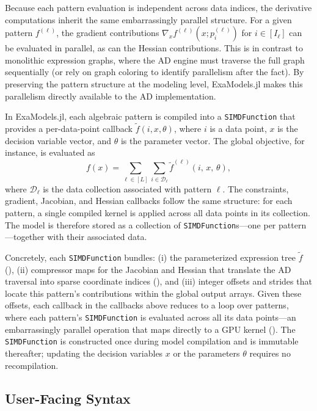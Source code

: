\documentclass[11pt]{article}
\begin{document}
Because each pattern evaluation is independent across data indices, the derivative computations inherit the same embarrassingly parallel structure. For a given pattern $f^{(\ell)}$, the gradient contributions $\nabla_x f^{(\ell)}(x; p_i^{(\ell)})$ for $i \in [I_\ell]$ can be evaluated in parallel, as can the Hessian contributions. This is in contrast to monolithic expression graphs, where the AD engine must traverse the full graph sequentially (or rely on graph coloring to identify parallelism after the fact). By preserving the pattern structure at the modeling level, ExaModels.jl makes this parallelism directly available to the AD implementation.

In ExaModels.jl, each algebraic pattern is compiled into a \texttt{SIMDFunction} that provides a per-data-point callback $\tilde{f}(i, x, \theta)$, where $i$ is a data point, $x$ is the decision variable vector, and $\theta$ is the parameter vector. The global objective, for instance, is evaluated as
\begin{equation}\label{eq:simdfunction}
  f(x) = \sum_{\ell \in [L]} \sum_{i \in \mathcal{D}_\ell} \tilde{f}^{(\ell)}(i,\, x,\, \theta),
\end{equation}
where $\mathcal{D}_\ell$ is the data collection associated with pattern $\ell$. The constraints, gradient, Jacobian, and Hessian callbacks follow the same structure: for each pattern, a single compiled kernel is applied across all data points in its collection. The model is therefore stored as a collection of \texttt{SIMDFunction}s---one per pattern---together with their associated data.

Concretely, each \texttt{SIMDFunction} bundles: (i) the parameterized expression tree $\tilde{f}$ (), (ii) compressor maps for the Jacobian and Hessian that translate the AD traversal into sparse coordinate indices (), and (iii) integer offsets and strides that locate this pattern's contributions within the global output arrays. Given these offsets, each callback in the callbacks above reduces to a loop over patterns, where each pattern's \texttt{SIMDFunction} is evaluated across all its data points---an embarrassingly parallel operation that maps directly to a GPU kernel (). The \texttt{SIMDFunction} is constructed once during model compilation and is immutable thereafter; updating the decision variables $x$ or the parameters $\theta$ requires no recompilation.

\subsection{User-Facing Syntax}
\label{sec:data:syntax}
\end{document}
